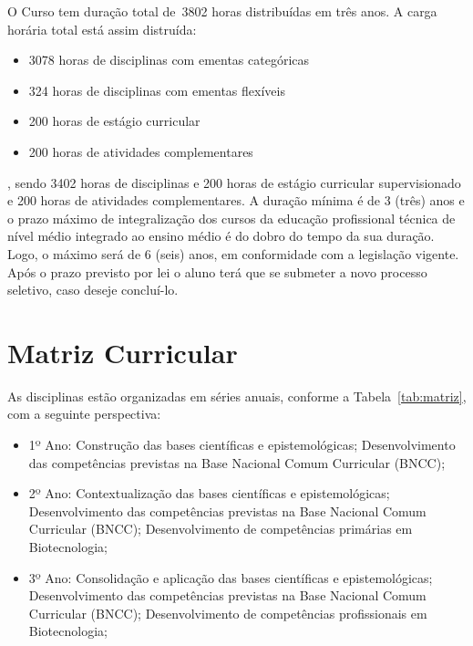 \documentclass[11pt,fleqn]{book} %
\newcommand{\VER}[1]{\begingroup\color{red}#1\endgroup}
\begin{document}
O Curso tem duração total de~\VER{3802} horas distribuídas em três anos.
A carga horária total está assim distruída:
\begin{itemize}
	\item \VER{3078} horas de disciplinas com ementas categóricas
	\item \VER{324} horas de disciplinas com ementas flexíveis
	\item \VER{200} horas de estágio curricular
	\item \VER{200} horas de atividades complementares
\end{itemize}
, sendo \VER{3402} horas de disciplinas e \VER{200} horas de estágio curricular supervisionado e \VER{200} horas de atividades complementares.
A duração mínima é de 3 (três) anos e o prazo máximo de integralização dos cursos da educação profissional técnica de nível médio integrado ao ensino médio é do dobro do tempo da sua duração. 
Logo, o máximo será de 6 (seis) anos, em conformidade com a legislação vigente. 
Após o prazo previsto por lei o aluno terá que se submeter a novo processo seletivo, caso deseje concluí-lo.


\section{Matriz Curricular}\label{matriz}
\indent

As disciplinas estão organizadas em séries anuais, conforme a Tabela~\ref{tab:matriz}, com a seguinte perspectiva:
\begin{itemize}
	\item 1º Ano: Construção das bases científicas e epistemológicas; Desenvolvimento das competências previstas na Base Nacional Comum Curricular (BNCC);
	\item 2º Ano: Contextualização das bases científicas e epistemológicas; Desenvolvimento das competências previstas na Base Nacional Comum Curricular (BNCC); Desenvolvimento de competências primárias em Biotecnologia;
	\item 3º Ano: Consolidação e aplicação das bases científicas e epistemológicas; Desenvolvimento das competências previstas na Base Nacional Comum Curricular (BNCC); Desenvolvimento de competências profissionais em Biotecnologia;
\end{itemize}
\end{document}
